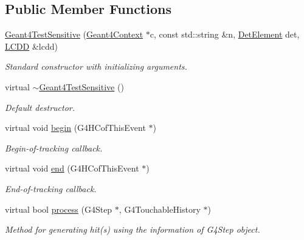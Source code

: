\subsection*{Public Member Functions}
\begin{DoxyCompactItemize}
\item 
\hyperlink{class_d_d4hep_1_1_simulation_1_1_test_1_1_geant4_test_sensitive_ad25fb0c90df85ec1ad12ab7dc4311fcc}{Geant4\+Test\+Sensitive} (\hyperlink{class_d_d4hep_1_1_simulation_1_1_geant4_context}{Geant4\+Context} $\ast$c, const std\+::string \&n, \hyperlink{class_d_d4hep_1_1_simulation_1_1_geant4_sensitive_a1cb1af5fb1194be1e1c1137f1e54272b}{Det\+Element} det, \hyperlink{class_d_d4hep_1_1_simulation_1_1_geant4_sensitive_a3373caa6917867ca7c871df20fb467c8}{L\+C\+DD} \&lcdd)
\begin{DoxyCompactList}\small\item\em Standard constructor with initializing arguments. \end{DoxyCompactList}\item 
virtual \hyperlink{class_d_d4hep_1_1_simulation_1_1_test_1_1_geant4_test_sensitive_a0f7b16af79f07274792ef1690a45d93c}{$\sim$\+Geant4\+Test\+Sensitive} ()
\begin{DoxyCompactList}\small\item\em Default destructor. \end{DoxyCompactList}\item 
virtual void \hyperlink{class_d_d4hep_1_1_simulation_1_1_test_1_1_geant4_test_sensitive_a7d7593372b9bfcc1e1a3f21ceef841d8}{begin} (G4\+H\+Cof\+This\+Event $\ast$)
\begin{DoxyCompactList}\small\item\em Begin-\/of-\/tracking callback. \end{DoxyCompactList}\item 
virtual void \hyperlink{class_d_d4hep_1_1_simulation_1_1_test_1_1_geant4_test_sensitive_accc5a2ae9369d9847ac25a01b55e6350}{end} (G4\+H\+Cof\+This\+Event $\ast$)
\begin{DoxyCompactList}\small\item\em End-\/of-\/tracking callback. \end{DoxyCompactList}\item 
virtual bool \hyperlink{class_d_d4hep_1_1_simulation_1_1_test_1_1_geant4_test_sensitive_aa5d824cbc3f5bfdd8e03236c8aec07ed}{process} (G4\+Step $\ast$, G4\+Touchable\+History $\ast$)
\begin{DoxyCompactList}\small\item\em Method for generating hit(s) using the information of G4\+Step object. \end{DoxyCompactList}\end{DoxyCompactItemize}
